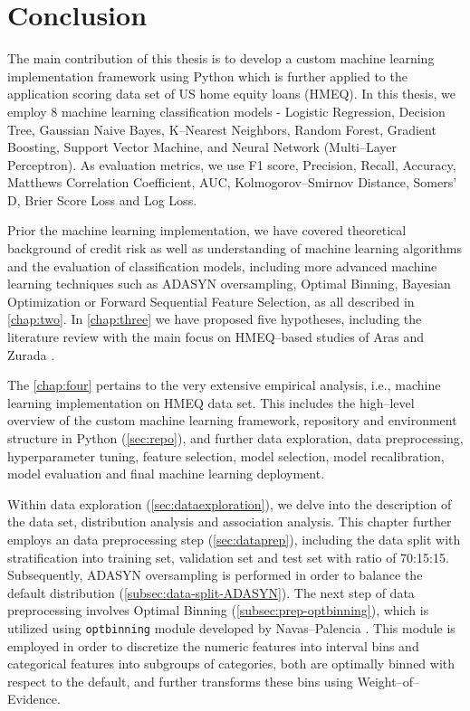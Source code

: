 \chapter{Conclusion}
\label{conclusion}

The main contribution of this thesis is to develop a custom machine learning implementation framework using Python which is further applied to the application scoring data set of US home equity loans (HMEQ).
In this thesis, we employ 8 machine learning classification models - Logistic Regression, Decision Tree, Gaussian Naive Bayes, K--Nearest Neighbors, Random Forest, Gradient Boosting, Support Vector Machine, and Neural Network (Multi--Layer Perceptron). As evaluation metrics, we use F1 score, Precision, Recall, Accuracy, Matthews Correlation Coefficient, AUC, Kolmogorov--Smirnov Distance, Somers' D, Brier Score Loss and Log Loss.

Prior the machine learning implementation, we have covered theoretical background of credit risk as well as understanding of machine learning algorithms and the evaluation of classification models, including more advanced machine learning techniques such as ADASYN oversampling, Optimal Binning, Bayesian Optimization or Forward Sequential Feature Selection, as all described in \autoref{chap:two}.
In \autoref{chap:three} we have proposed five hypotheses, including the literature review with the main focus on HMEQ--based studies of Aras \citep{serkan2021bagging} and Zurada \citep{zurada2014classification}.

The \autoref{chap:four} pertains to the very extensive empirical analysis, i.e., machine learning implementation on HMEQ data set.  This includes the high--level overview of the custom machine learning framework, repository and environment structure in Python (\autoref{sec:repo}), and further data exploration, data preprocessing, hyperparameter tuning, feature selection, model selection, model recalibration, model evaluation and final machine learning deployment.


Within data exploration (\autoref{sec:dataexploration}), we delve into the description of the data set, distribution analysis and association analysis.
This chapter further employs an data preprocessing step (\autoref{sec:dataprep}), including the data split with stratification into training set, validation set  and test set with ratio of 70:15:15.
Subsequently, ADASYN oversampling is performed in order to balance the default distribution (\autoref{subsec:data-split-ADASYN}).
The next step of data preprocessing involves Optimal Binning (\autoref{subsec:prep-optbinning}), which is utilized using \lstinline{optbinning} module developed by Navas--Palencia \citep{navas2020optimal}. This module is employed in order to discretize the numeric features into interval bins and categorical features into subgroups of categories, both are optimally binned with respect to the default, and further transforms these bins using Weight--of--Evidence.


